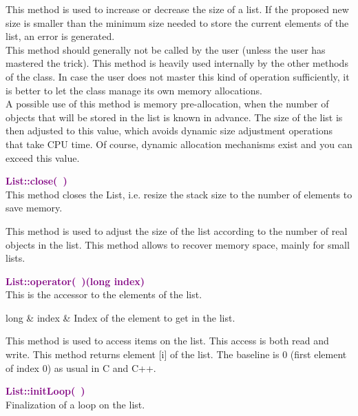 This method is used to increase or decrease the size of a list.
If the proposed new size is smaller than the minimum size needed to store the current elements of the list, an error is generated.\\
This method should generally not be called by the user (unless the user has mastered the trick).
This method is heavily used internally by the other methods of the class.
In case the user does not master this kind of operation sufficiently, it is better to let the class manage its own memory allocations.\\
A possible use of this method is memory pre-allocation, when the number of objects that will be stored in the list is known in advance.
The size of the list is then adjusted to this value, which avoids dynamic size adjustment operations that take CPU time.
Of course, dynamic allocation mechanisms exist and you can exceed this value.

\textcolor{purple}{\textbf{List::close(~)}}\label{List::close()}\\
This method closes the List, i.e. resize the stack size to the number of elements to save memory.

This method is used to adjust the size of the list according to the number of real objects in the list.
This method allows to recover memory space, mainly for small lists.

\textcolor{purple}{\textbf{List::operator(~)(long index)}}\label{List::operator()(long index)}\\
This is the accessor to the elements of the list.

\begin{tcolorbox}[width=\textwidth,myArgs,tabularx={ll|R}]
long & index & Index of the element to get in the list.
\end{tcolorbox}

This method is used to access items on the list.
This access is both read and write.
This method returns element [i] of the list.
The baseline is 0 (first element of index 0) as usual in C and C++.

\textcolor{purple}{\textbf{List::initLoop(~)}}\label{List::initLoop()}\\
Finalization of a loop on the list.

